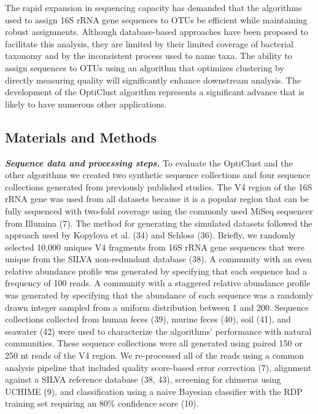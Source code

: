 \documentclass[11pt,]{article}
\begin{document}
The rapid expansion in sequencing capacity has demanded that the
algorithms used to assign 16S rRNA gene sequences to OTUs be efficient
while maintaining robust assignments. Although database-based approaches
have been proposed to facilitate this analysis, they are limited by
their limited coverage of bacterial taxonomy and by the inconsistent
process used to name taxa. The ability to assign sequences to OTUs using
an algorithm that optimizes clustering by directly measuring quality
will significantly enhance downstream analysis. The development of the
OptiClust algorithm represents a significant advance that is likely to
have numerous other applications.

\subsection{Materials and Methods}\label{materials-and-methods}

\textbf{\emph{Sequence data and processing steps.}} To evaluate the
OptiClust and the other algorithms we created two synthetic sequence
collections and four sequence collections generated from previously
published studies. The V4 region of the 16S rRNA gene was used from all
datasets because it is a popular region that can be fully sequenced with
two-fold coverage using the commonly used MiSeq sequencer from Illumina
(7). The method for generating the simulated datasets followed the
approach used by Kopylova et al. (34) and Schloss (36). Briefly, we
randomly selected 10,000 uniques V4 fragments from 16S rRNA gene
sequences that were unique from the SILVA non-redundant database (38). A
community with an even relative abundance profile was generated by
specifying that each sequence had a frequency of 100 reads. A community
with a staggered relative abundance profile was generated by specifying
that the abundance of each sequence was a randomly drawn integer sampled
from a uniform distribution between 1 and 200. Sequence collections
collected from human feces (39), murine feces (40), soil (41), and
seawater (42) were used to characterize the algorithms' performance with
natural communities. These sequence collections were all generated using
paired 150 or 250 nt reads of the V4 region. We re-processed all of the
reads using a common analysis pipeline that included quality score-based
error correction (7), alignment against a SILVA reference database (38,
43), screening for chimeras using UCHIME (9), and classification using a
naive Bayesian classifier with the RDP training set requiring an 80\%
confidence score (10).
\end{document}

